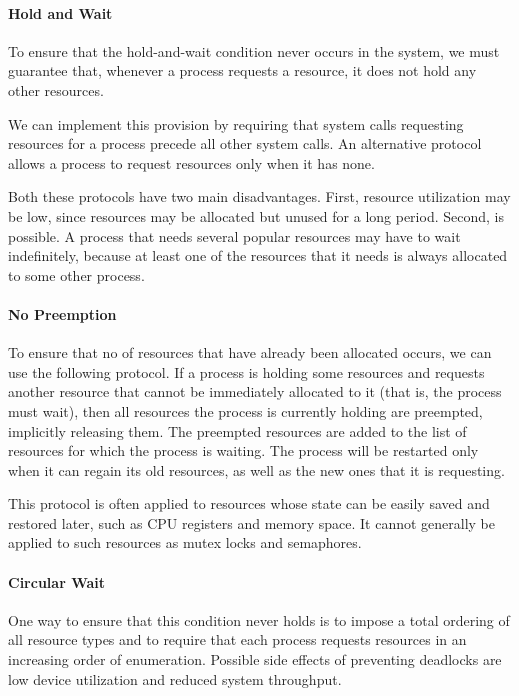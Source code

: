 \paragraph{Hold and Wait}\label{par:Deadlock_Prevention-Hold_Wait}
To ensure that the hold-and-wait condition never occurs in the system, we must guarantee that, whenever a process requests a resource, it does not hold any other resources.

We can implement this provision by requiring that system calls requesting resources for a process precede all other system calls.
An alternative protocol allows a process to request resources only when it has none.

Both these protocols have two main disadvantages.
First, resource utilization may be low, since resources may be allocated but unused for a long period.
Second,  is possible.
A process that needs several popular resources may have to wait indefinitely, because at least one of the resources that it needs is always allocated to some other process.

\paragraph{No Preemption}\label{par:Deadlock_Prevention-No_Preemption}
To ensure that no  of resources that have already been allocated occurs, we can use the following protocol.
If a process is holding some resources and requests another resource that cannot be immediately allocated to it (that is, the process must wait), then all resources the process is currently holding are preempted, implicitly releasing them.
The preempted resources are added to the list of resources for which the process is waiting.
The process will be restarted only when it can regain its old resources, as well as the new ones that it is requesting.

This protocol is often applied to resources whose state can be easily saved and restored later, such as CPU registers and memory space.
It cannot generally be applied to such resources as mutex locks and semaphores.

\paragraph{Circular Wait}\label{par:Deadlock_Prevention-Circular_Wait}
One way to ensure that this condition never holds is to impose a total ordering of all resource types and to require that each process requests resources in an increasing order of enumeration.
Possible side effects of preventing deadlocks are low device utilization and reduced system throughput.

